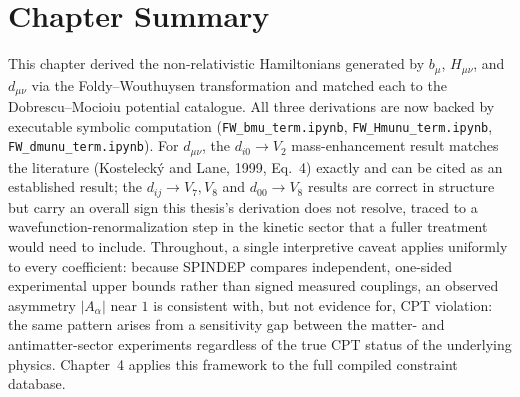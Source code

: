 \documentclass[main]{subfiles}
\begin{document}
\section{Chapter Summary}

This chapter derived the non-relativistic Hamiltonians generated by $b_\mu$,
$H_{\mu\nu}$, and $d_{\mu\nu}$ via the Foldy--Wouthuysen transformation and
matched each to the Dobrescu--Mocioiu potential catalogue. All three
derivations are now backed by executable symbolic computation
(\texttt{FW\_bmu\_term.ipynb}, \texttt{FW\_Hmunu\_term.ipynb},
\texttt{FW\_dmunu\_term.ipynb}). For $d_{\mu\nu}$, the $d_{i0}\to V_2$
mass-enhancement result matches the literature (Kostelecký and Lane, 1999,
Eq.~4) exactly and can be cited as an established result; the $d_{ij}\to
V_7,V_8$ and $d_{00}\to V_8$ results are correct in structure but carry an
overall sign this thesis's derivation does not resolve, traced to a
wavefunction-renormalization step in the kinetic sector that a fuller
treatment would need to include. Throughout, a single
interpretive caveat applies uniformly to every coefficient: because SPINDEP
compares independent, one-sided experimental upper bounds rather than
signed measured couplings, an observed asymmetry $|A_\alpha|$ near $1$ is
consistent with, but not evidence for, CPT violation: the same pattern
arises from a sensitivity gap between the matter- and antimatter-sector
experiments regardless of the true CPT status of the underlying physics.
Chapter~4 applies this framework to the full compiled constraint database.
\end{document}
